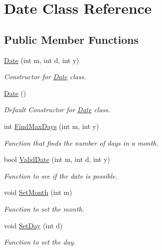 \hypertarget{class_date}{}\section{Date Class Reference}
\label{class_date}
\subsection*{Public Member Functions}
\begin{DoxyCompactItemize}
\item 
\mbox{\hyperlink{class_date_a8852e910e80f96d9fbf496f19a1481c5}{Date}} (int m, int d, int y)
\begin{DoxyCompactList}\small\item\em Constructor for \mbox{\hyperlink{class_date}{Date}} class. \end{DoxyCompactList}\item 
\mbox{\hyperlink{class_date_a4e59ed4ba66eec61c27460c5d09fa1bd}{Date}} ()
\begin{DoxyCompactList}\small\item\em Default Constructor for \mbox{\hyperlink{class_date}{Date}} class. \end{DoxyCompactList}\item 
int \mbox{\hyperlink{class_date_aa05e21ab88416e8f74f3f58abf80770f}{Find\+Max\+Days}} (int m, int y)
\begin{DoxyCompactList}\small\item\em Function that finds the number of days in a month. \end{DoxyCompactList}\item 
bool \mbox{\hyperlink{class_date_ac195c8a2d57b37dcbf3f0c555d403b5e}{Valid\+Date}} (int m, int d, int y)
\begin{DoxyCompactList}\small\item\em Function to see if the date is possible. \end{DoxyCompactList}\item 
void \mbox{\hyperlink{class_date_ae47ff4dbe38076b995703ecb4aa5c602}{Set\+Month}} (int m)
\begin{DoxyCompactList}\small\item\em Function to set the month. \end{DoxyCompactList}\item 
void \mbox{\hyperlink{class_date_ab2d0573c89abb758c92b429874ad9ae2}{Set\+Day}} (int d)
\begin{DoxyCompactList}\small\item\em Function to set the day. \end{DoxyCompactList}\item 

\end{DoxyCompactItemize}
